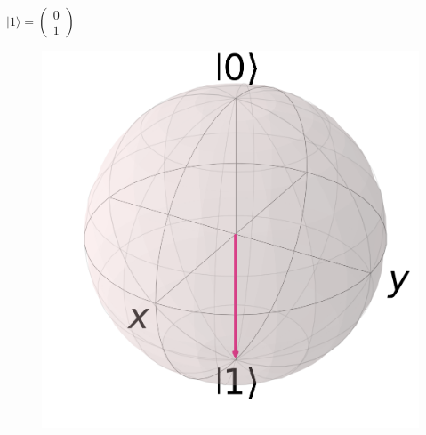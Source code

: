 \documentclass{beamer}
\newcommand{\ket}[1]{\lvert#1\rangle} %
\begin{document}
\begin{frame}
\begin{columns}[c]
		\begin{column}{.3\textwidth}
			\centering
			$\ket{1} = \begin{pmatrix}
			0\\
			1
			\end{pmatrix}$
			\begin{figure}
				\centering
				\includegraphics[width=1\textwidth]{qubit1.png}            
			\end{figure}
		\end{column}
				

\end{columns}
\end{frame}
\end{document}
